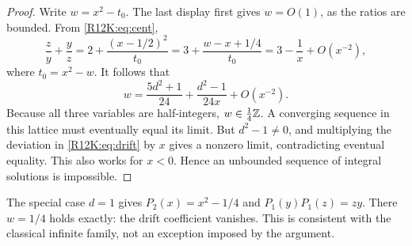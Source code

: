 \documentclass[11pt,a4paper]{article}
\begin{document}
\begin{proof}
Write \(w=x^2-t_0\). The last display first gives \(w=O(1)\), as the ratios are bounded. From \eqref{R12K:eq:cent},
\[
 \frac{z}{y}+\frac{y}{z}
   =2+\frac{(x-1/2)^2}{t_0}
   =3+\frac{w-x+1/4}{t_0}
   =3-\frac1x+O(x^{-2}),
\]
where \(t_0=x^2-w\). It follows that
\begin{equation}\label{R12K:eq:drift}
 w=\frac{5d^2+1}{24}+\frac{d^2-1}{24x}+O(x^{-2}).
\end{equation}
Because all three variables are half-integers, \(w\in\frac14\mathbb Z\). A converging sequence in this lattice must eventually equal its limit. But \(d^2-1\ne0\), and multiplying the deviation in \eqref{R12K:eq:drift} by \(x\) gives a nonzero limit, contradicting eventual equality. This also works for \(x<0\). Hence an unbounded sequence of integral solutions is impossible.
\end{proof}

The special case \(d=1\) gives \(P_2(x)=x^2-1/4\) and \(P_1(y)P_1(z)=zy\). There \(w=1/4\) holds exactly: the drift coefficient vanishes. This is consistent with the classical infinite family, not an exception imposed by the argument.
\end{document}
